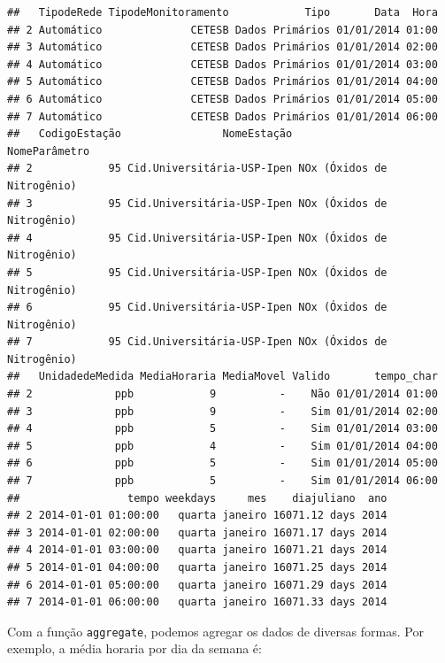 \documentclass[]{book}
\newenvironment{Shaded}{\begin{snugshade}}{\end{snugshade}}
\newcommand{\KeywordTok}[1]{\textcolor[rgb]{0.13,0.29,0.53}{\textbf{#1}}}
\newcommand{\DataTypeTok}[1]{\textcolor[rgb]{0.13,0.29,0.53}{#1}}
\newcommand{\StringTok}[1]{\textcolor[rgb]{0.31,0.60,0.02}{#1}}
\newcommand{\OperatorTok}[1]{\textcolor[rgb]{0.81,0.36,0.00}{\textbf{#1}}}
\newcommand{\NormalTok}[1]{#1}
\theoremstyle{definition}
\theoremstyle{definition}
\theoremstyle{definition}
\theoremstyle{remark}
\begin{document}
\begin{verbatim}
##   TipodeRede TipodeMonitoramento            Tipo       Data  Hora
## 2 Automático              CETESB Dados Primários 01/01/2014 01:00
## 3 Automático              CETESB Dados Primários 01/01/2014 02:00
## 4 Automático              CETESB Dados Primários 01/01/2014 03:00
## 5 Automático              CETESB Dados Primários 01/01/2014 04:00
## 6 Automático              CETESB Dados Primários 01/01/2014 05:00
## 7 Automático              CETESB Dados Primários 01/01/2014 06:00
##   CodigoEstação                NomeEstação              NomeParâmetro
## 2            95 Cid.Universitária-USP-Ipen NOx (Óxidos de Nitrogênio)
## 3            95 Cid.Universitária-USP-Ipen NOx (Óxidos de Nitrogênio)
## 4            95 Cid.Universitária-USP-Ipen NOx (Óxidos de Nitrogênio)
## 5            95 Cid.Universitária-USP-Ipen NOx (Óxidos de Nitrogênio)
## 6            95 Cid.Universitária-USP-Ipen NOx (Óxidos de Nitrogênio)
## 7            95 Cid.Universitária-USP-Ipen NOx (Óxidos de Nitrogênio)
##   UnidadedeMedida MediaHoraria MediaMovel Valido       tempo_char
## 2             ppb            9          -    Não 01/01/2014 01:00
## 3             ppb            9          -    Sim 01/01/2014 02:00
## 4             ppb            5          -    Sim 01/01/2014 03:00
## 5             ppb            4          -    Sim 01/01/2014 04:00
## 6             ppb            5          -    Sim 01/01/2014 05:00
## 7             ppb            5          -    Sim 01/01/2014 06:00
##                 tempo weekdays     mes    diajuliano  ano
## 2 2014-01-01 01:00:00   quarta janeiro 16071.12 days 2014
## 3 2014-01-01 02:00:00   quarta janeiro 16071.17 days 2014
## 4 2014-01-01 03:00:00   quarta janeiro 16071.21 days 2014
## 5 2014-01-01 04:00:00   quarta janeiro 16071.25 days 2014
## 6 2014-01-01 05:00:00   quarta janeiro 16071.29 days 2014
## 7 2014-01-01 06:00:00   quarta janeiro 16071.33 days 2014
\end{verbatim}

Com a função \texttt{aggregate}, podemos agregar os dados de diversas
formas. Por exemplo, a média horaria por dia da semana é:

\begin{Shaded}
\end{Shaded}
\end{document}
